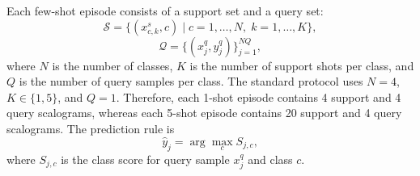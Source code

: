 \documentclass[journal]{IEEEtran}
\newcommand{\Sset}{\mathcal{S}}
\newcommand{\Qset}{\mathcal{Q}}
\newcommand{\1}{\mathbf{1}}
\begin{document}
Each few-shot episode consists of a support set and a query set:
\begin{equation}
    \Sset=
    \{(x_{c,k}^{s},c)\mid c=1,\ldots,N,\;k=1,\ldots,K\},
    \label{eq:support_set}
\end{equation}
\begin{equation}
    \Qset=\{(x_j^q,y_j^q)\}_{j=1}^{NQ},
    \label{eq:query_set}
\end{equation}
where $N$ is the number of classes, $K$ is the number of support shots per class, and $Q$ is the number of query samples per class. The standard protocol uses $N=4$, $K\in\{1,5\}$, and $Q=1$. Therefore, each 1-shot episode contains 4 support and 4 query scalograms, whereas each 5-shot episode contains 20 support and 4 query scalograms. The prediction rule is
\begin{equation}
    \hat{y}_j=\arg\max_c S_{j,c},
    \label{eq:prediction}
\end{equation}
where $S_{j,c}$ is the class score for query sample $x_j^q$ and class $c$.
\end{document}
